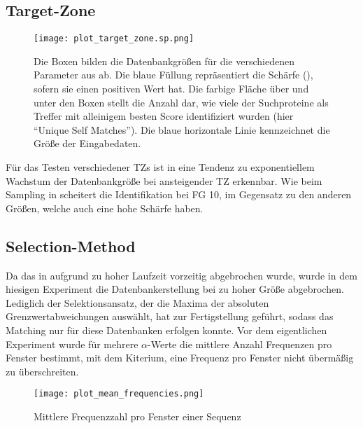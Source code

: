     \subsection{Target-Zone} %
        \label{sub:target_results}
        \begin{figure}[H]
            \centering
            \texttt{[image: plot\_target\_zone.sp.png]}
            \caption[Single-Protein-Matching ]{Die Boxen bilden die Datenbankgrößen für die verschiedenen Parameter aus  ab. Die blaue Füllung repräsentiert die Schärfe (), sofern sie einen positiven Wert hat. Die farbige Fläche über und unter den Boxen stellt die Anzahl dar, wie viele der Suchproteine als Treffer mit alleinigem besten Score identifiziert wurden (hier ``Unique Self Matches''). Die blaue horizontale Linie kennzeichnet die Größe der Eingabedaten.}
            \label{fig:target_zone.sp}
        \end{figure}

        Für das Testen verschiedener \aclp{TZ} ist in  eine Tendenz zu exponentiellem Wachstum der Datenbankgröße bei ansteigender \ac{TZ} erkennbar. Wie beim Sampling in  scheitert die Identifikation bei \ac{FG} 10, im Gegensatz zu den anderen Größen, welche auch eine hohe Schärfe haben.

    \subsection{Selection-Method} %
        \label{sub:selection_results}
        Da das  in  aufgrund zu hoher Laufzeit vorzeitig abgebrochen wurde, wurde in dem hiesigen Experiment die Datenbankerstellung bei zu hoher Größe abgebrochen. Lediglich der Selektionsansatz, der die Maxima der absoluten Grenzwertabweichungen auswählt, hat zur Fertigstellung geführt, sodass das Matching nur für diese Datenbanken erfolgen konnte. Vor dem eigentlichen Experiment wurde für mehrere $\alpha$-Werte die mittlere Anzahl Frequenzen pro Fenster bestimmt, mit dem Kiterium, eine Frequenz pro Fenster nicht übermäßig zu überschreiten.

        \begin{figure}[H]
             \texttt{[image: plot\_mean\_frequencies.png]}
             \caption{Mittlere Frequenzzahl pro Fenster einer Sequenz}
             \label{fig:mean_frequencies}
        \end{figure} 

